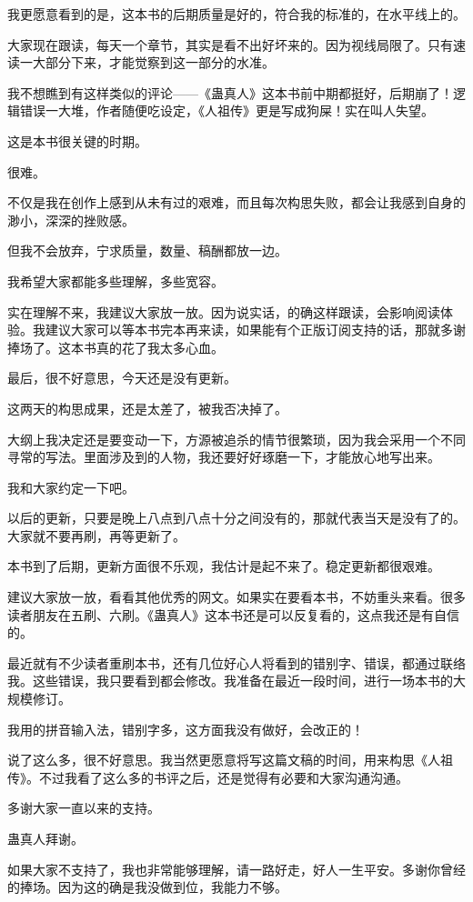 \begin{this_body}
我更愿意看到的是，这本书的后期质量是好的，符合我的标准的，在水平线上的。

大家现在跟读，每天一个章节，其实是看不出好坏来的。因为视线局限了。只有速读一大部分下来，才能觉察到这一部分的水准。

我不想瞧到有这样类似的评论——《蛊真人》这本书前中期都挺好，后期崩了！逻辑错误一大堆，作者随便吃设定，《人祖传》更是写成狗屎！实在叫人失望。

这是本书很关键的时期。

很难。

不仅是我在创作上感到从未有过的艰难，而且每次构思失败，都会让我感到自身的渺小，深深的挫败感。

但我不会放弃，宁求质量，数量、稿酬都放一边。

我希望大家都能多些理解，多些宽容。

实在理解不来，我建议大家放一放。因为说实话，的确这样跟读，会影响阅读体验。我建议大家可以等本书完本再来读，如果能有个正版订阅支持的话，那就多谢捧场了。这本书真的花了我太多心血。

最后，很不好意思，今天还是没有更新。

这两天的构思成果，还是太差了，被我否决掉了。

大纲上我决定还是要变动一下，方源被追杀的情节很繁琐，因为我会采用一个不同寻常的写法。里面涉及到的人物，我还要好好琢磨一下，才能放心地写出来。

我和大家约定一下吧。

以后的更新，只要是晚上八点到八点十分之间没有的，那就代表当天是没有了的。大家就不要再刷，再等更新了。

本书到了后期，更新方面很不乐观，我估计是起不来了。稳定更新都很艰难。

建议大家放一放，看看其他优秀的网文。如果实在要看本书，不妨重头来看。很多读者朋友在五刷、六刷。《蛊真人》这本书还是可以反复看的，这点我还是有自信的。

最近就有不少读者重刷本书，还有几位好心人将看到的错别字、错误，都通过联络我。这些错误，我只要看到都会修改。我准备在最近一段时间，进行一场本书的大规模修订。

我用的拼音输入法，错别字多，这方面我没有做好，会改正的！

说了这么多，很不好意思。我当然更愿意将写这篇文稿的时间，用来构思《人祖传》。不过我看了这么多的书评之后，还是觉得有必要和大家沟通沟通。

多谢大家一直以来的支持。

蛊真人拜谢。

如果大家不支持了，我也非常能够理解，请一路好走，好人一生平安。多谢你曾经的捧场。因为这的确是我没做到位，我能力不够。


\end{this_body}

